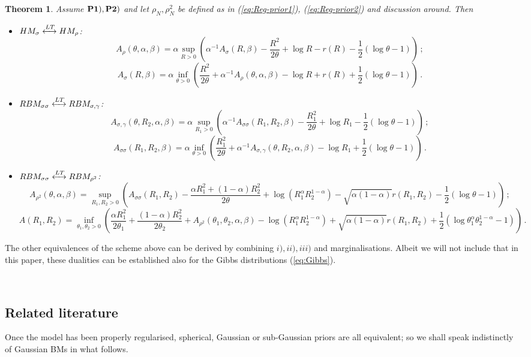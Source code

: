 \documentclass[10pt,oneside,a4paper,reqno]{amsart}  %
\def\be{\begin{equation}}
\def\ee{\end{equation}}
\def\a{\alpha}
\def\g{\gamma}
\def\b{\beta}
\def\r{\rho}
\def\s{\sigma}
\theoremstyle{plain}
\newtheorem{theorem}{Theorem}[section]
\numberwithin{equation}{section}
\begin{document}
\begin{theorem}\label{th:main}
Assume $\bf P1), P2)$ and let $\r_N, \r^2_N$ be defined as in (\ref{eq:Reg-prior1}), (\ref{eq:Reg-prior2}) and discussion around. Then
\begin{itemize}
\item[i)] $HM_{\s}\xleftrightarrow{LT} HM_{\r}$:
\be\label{eq:mainHM}
A_\r(\theta,\a,\b)=\a \sup_{R>0}\left( \a^{-1}A_{\s}(R,\b) -\frac{R^2}{2\theta}+\log R- r(R) -\frac12(\log\theta-1) \right)\,;
\ee
\be\label{eq:mainHM-dual}
A_{\s}(R,\b)=\a \inf_{\theta>0}\left(\frac{R^2}{2\theta}+\a^{-1}A_\r(\theta,\a,\b) -\log R+ r(R)+\frac12(\log\theta-1)\right)\,.
\ee
\item[ii)] $RBM_{\s\s}\xleftrightarrow{LT} RBM_{\s,\g}$:
\be\label{eq:mainRBM1}
A_{\s,\g}(\theta,R_2,\a,\b)=\a\sup_{R_1>0}\left(\a^{-1}A_{\s\s}(R_1,R_2,\b)-\frac{R_1^2}{2\theta}+\log R_1 -\frac12(\log\theta-1)\right)\,;
\ee
\be\label{eq:mainRBM1-dual}
A_{\s\s}(R_1,R_2,\b)=\a\inf_{\theta>0}\left(\frac{R_1^2}{2\theta}+\a^{-1}A_{\s,\g}(\theta,R_2,\a,\b)-\log R_1+\frac12(\log\theta-1)\right)\,.
\ee
\item[iii)] $RBM_{\s\s}\xleftrightarrow{LT} RBM_{\r^2}$:
\be\label{eq:mainRBM2}
A_{\r^2}(\theta,\a,\b)=\sup_{R_1,R_2>0}\left(A_{\s\s}(R_1,R_2)-\frac{\a R_1^2+(1-\a)R_2^2}{2\theta}+\log(R_1^\a R_2^{1-\a})-\sqrt{\a(1-\a)}r(R_1,R_2)-\frac12(\log\theta-1)\right)\,;
\ee
\be\label{eq:mainRBM2-dual}
A(R_1,R_2)=\inf_{\theta_1,\theta_2>0}\left(\frac{\a R_1^2}{2\theta_1}+\frac{(1-\a)R_2^2}{2\theta_2}+A_{\r^2}(\theta_1,\theta_2,\a,\b)-\log(R_1^\a R_2^{1-\a})+\sqrt{\a(1-\a)}r(R_1,R_2)+\frac12(\log\theta_1^\a\theta_2^{1-\a}-1)\right)\,. 
\ee
\end{itemize}

\end{theorem}

The other equivalences of the scheme above can be derived by combining $i), ii), iii)$ and marginalisations. Albeit we will not include that in this paper, these dualities can be established also for the Gibbs distributions (\ref{eq:Gibbs}). 

\

\subsection{Related literature}

Once the model has been properly regularised, spherical, Gaussian or sub-Gaussian priors are all equivalent; so we shall speak indistinctly of Gaussian BMs in what follows.  
\end{document}
